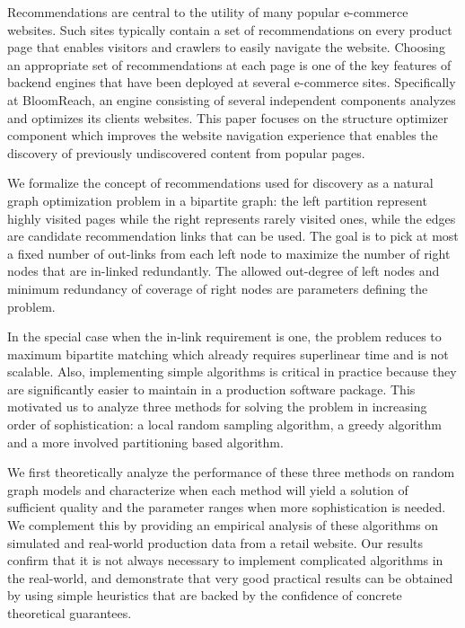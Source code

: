 \abstract


Recommendations are central to the utility of many popular e-commerce websites. Such sites
typically contain a set of recommendations on every product page that
enables visitors and crawlers to easily navigate the website. Choosing an
appropriate set of recommendations at each page is one of the key
features of backend engines that have been deployed at several e-commerce
sites. Specifically at BloomReach, an engine consisting of several
independent components analyzes and optimizes its clients
websites. This paper focuses on the structure optimizer component
which improves the website navigation experience that enables the
discovery of previously undiscovered content from popular pages.\vs


We formalize the concept of recommendations used
for discovery as a natural graph optimization
problem in a bipartite graph: the left partition represent highly
visited pages while the right represents rarely visited ones, while the edges are candidate recommendation links that can be used. 
The goal is to pick at most a fixed number of out-links from each left node to maximize the number of right nodes that are in-linked redundantly. The allowed out-degree of left nodes and minimum redundancy of coverage of right nodes are parameters defining the problem.

In the special case when the in-link requirement is one, the problem reduces to maximum bipartite matching which already requires
superlinear time and is not scalable. Also, implementing simple
algorithms is critical in practice because they are significantly
easier to maintain in a production software package. This motivated us
to analyze three methods for solving the problem in increasing order
of sophistication: a local random sampling algorithm, a greedy algorithm
and a more involved partitioning based algorithm. \vs

We first theoretically analyze the performance of these three methods
on random graph models and characterize when each method will yield a
solution of sufficient quality and the parameter ranges when more
sophistication is needed. We complement this by providing an empirical
analysis of these algorithms on simulated and real-world production
data from a retail website. Our results confirm that it is not always necessary to implement  complicated algorithms in the real-world, and
demonstrate that very good practical results can be obtained by
using simple heuristics that are backed by the confidence of concrete
theoretical guarantees. \vs

